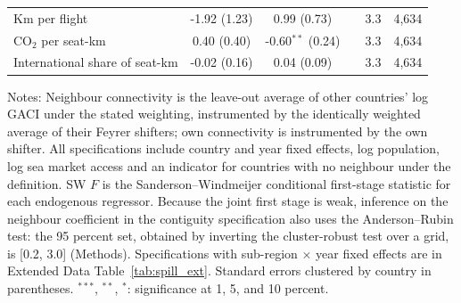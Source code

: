 \begin{table}[H]
{\begin{threeparttable}
\begin{tabular}{lccccc}
  Km per flight & -1.92 (1.23) & 0.99 (0.73) & & 3.3 & 4,634 \\
  CO$_2$ per seat-km & 0.40 (0.40) & -0.60$^{**}$ (0.24) & & 3.3 & 4,634 \\
  International share of seat-km & -0.02 (0.16) & 0.04 (0.09) & & 3.3 & 4,634 \\
\bottomrule
\end{tabular}
\begin{tablenotes}[flushleft]
\footnotesize
\item Notes: Neighbour connectivity is the leave-out average of other countries' log GACI under the stated weighting, instrumented by the identically weighted average of their Feyrer shifters; own connectivity is instrumented by the own shifter. All specifications include country and year fixed effects, log population, log sea market access and an indicator for countries with no neighbour under the definition. SW $F$ is the Sanderson--Windmeijer conditional first-stage statistic for each endogenous regressor. Because the joint first stage is weak, inference on the neighbour coefficient in the contiguity specification also uses the Anderson--Rubin test: the 95 percent set, obtained by inverting the cluster-robust test over a grid, is [0.2, 3.0] (Methods). Specifications with sub-region $\times$ year fixed effects are in Extended Data Table~\ref{tab:spill_ext}. Standard errors clustered by country in parentheses. $^{***}$, $^{**}$, $^{*}$: significance at 1, 5, and 10 percent.
\end{tablenotes}
\end{threeparttable}}
\end{table}


